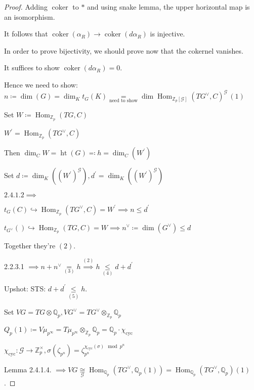 \documentclass{article}
\theoremstyle{definition}
\numberwithin{theorem}{subsection}
\begin{document}
\begin{proof}
        Adding \(\operatorname{coker}\) to \(\ast\) and using snake lemma, the upper horizontal map is an isomorphism.

        It follows that \(\operatorname{coker}(\alpha_R) \to \operatorname{coker} (d \alpha_R)\) is injective.

        In order to prove bijectivity, we should prove now that the cokernel vanishes.

        It suffices to show \(\operatorname{coker} (d \alpha_R) = 0\).

        Hence we need to show: \(n \coloneqq \dim (G) = \dim_K t_G(K) \underset{\text{need to show}}{=} \dim \operatorname{Hom}_{\mathbb{Z}_p[\mathscr{G}]}(TG^\vee, C)^{\mathscr{G}} \, (1)\)
        
        Set \(W\coloneqq \operatorname{Hom}_{\mathbb{Z}_p}(TG, C)\)

        \(W^{\prime} = \operatorname{Hom}_{\mathbb{Z}_p}(TG^\vee, C)\) 

        Then \(\dim_C W = \operatorname{ht} (G) \eqqcolon h = \dim_C(W^{\prime})\)

        Set \(d \coloneqq \dim_K ((W^{\prime})^{\mathscr{G}}), d^{\prime} = \dim_K((W^{\prime})^{\mathscr{G}})\)

        \(2.4.1.2 \implies\)

        \(t_G(C) \hookrightarrow \operatorname{Hom}_{\mathbb{Z}_p}(TG^\vee, C) = W^{\prime} \implies n \leq d^{\prime}\) 

        \(t_{G^\vee}() \hookrightarrow \operatorname{Hom}_{\mathbb{Z}_p}(TG,C) = W \implies n^\vee \coloneqq \dim (G^\vee) \leq d\)
        
        Together they're \((2)\).

        2.2.3.1 \(\implies n + n^\vee \underset{(3)}{=} h \overset{(2)}{\implies} h \underset{(4)}{\leq } d + d^{\prime}\)
        
        Upshot: STS: \(d + d^{\prime} \underset{(5)}{\leq} h\).
        
        Set \(VG = TG \otimes \mathbb{Q}_p, VG^\vee = TG^\vee \otimes_{\mathbb{Z}_p} \mathbb{Q}_p\)

        \(Q_p(1) \coloneqq V\mu_{p^{\infty}} = T \mu_{p^{\infty}} \otimes_{\mathbb{Z}_p} \mathbb{Q}_p = \mathbb{Q}_p \cdot \chi_{\text{cyc}}\)

        \(\chi_{\text{cyc}}: \mathscr{G} \to \mathbb{Z}_p^\times , \sigma(\zeta_{p^n}) = \zeta_{p^n}^{\chi_{\text{cyc}}(\sigma) \mod p^n}\) 

        Lemma 2.4.1.4. \(\implies VG \underset{\mathscr{G}}{\cong} \operatorname{Hom}_{\mathbb{Q}_p}(TG^\vee, \mathbb{Q}_p(1)) = \operatorname{Hom}_{\mathbb{Q}_p}(TG^\vee, \mathbb{Q}_p)(1)\).


\end{proof}
\end{document}
